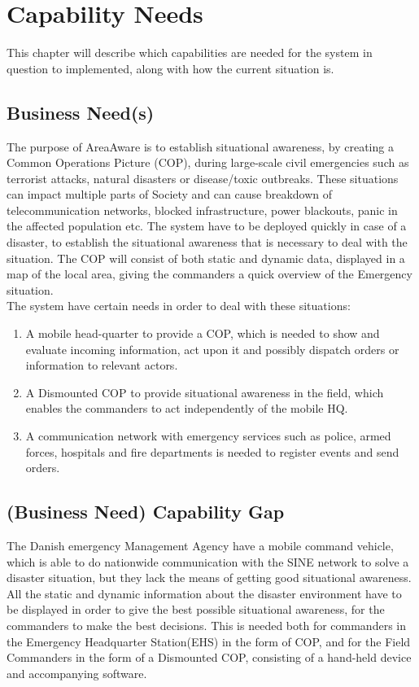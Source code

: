 \chapter{Capability Needs}
\label{chp_need}

This chapter will describe which capabilities are needed for the system in question to implemented, along with how the current situation is.

\section{Business Need(s)}
The purpose of AreaAware is to establish situational awareness, by creating a Common Operations Picture (COP), during large-scale civil emergencies such as terrorist attacks, natural disasters or disease/toxic outbreaks. These situations can impact multiple parts of Society and can cause breakdown of telecommunication networks, blocked infrastructure, power blackouts, panic in the affected population etc. The system have to be deployed quickly in case of a disaster, to establish the situational awareness that is necessary to deal with the situation. The COP will consist of both static and dynamic data, displayed in a map of the local area, giving the commanders a quick overview of the Emergency situation. \\

\noindent The system have certain needs in order to deal with these situations:
\begin{enumerate}
	\item A mobile head-quarter to provide a COP, which is needed to show and evaluate incoming information, act upon it and possibly dispatch orders or information to relevant actors.
	\item A Dismounted COP to provide situational awareness in the field, which enables the commanders to act independently of the mobile HQ.
	\item A communication network with emergency services such as police, armed forces, hospitals and fire departments is needed to register events and send orders.
\end{enumerate}

\section{(Business Need) Capability Gap}
The Danish emergency Management Agency have a mobile command vehicle, which is able to do nationwide communication with the SINE network to solve a disaster situation, but they lack the means of getting good situational awareness. All the static and dynamic information about the disaster environment have to be displayed in order to give the best possible situational awareness, for the commanders to make the best decisions. This is needed both for commanders in the Emergency Headquarter Station(EHS) in the form of COP, and for the Field Commanders in the form of a Dismounted COP, consisting of a hand-held device and accompanying software.

